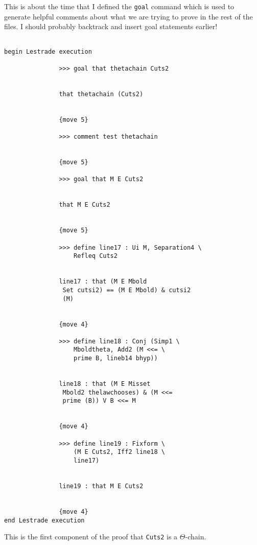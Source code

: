 \documentclass[12pt]{article}
\begin{document}
This is about the time that I defined the {\tt goal} command which is used to generate helpful comments about what we are trying to prove in the rest of the files.  I should probably
backtrack and insert goal statements earlier!


\begin{verbatim}

begin Lestrade execution

               >>> goal that thetachain Cuts2


               that thetachain (Cuts2)


               {move 5}

               >>> comment test thetachain


               {move 5}

               >>> goal that M E Cuts2


               that M E Cuts2


               {move 5}

               >>> define line17 : Ui M, Separation4 \
                   Refleq Cuts2


               line17 : that (M E Mbold 
                Set cutsi2) == (M E Mbold) & cutsi2 
                (M)


               {move 4}

               >>> define line18 : Conj (Simp1 \
                   Mboldtheta, Add2 (M <<= \
                   prime B, lineb14 bhyp))


               line18 : that (M E Misset 
                Mbold2 thelawchooses) & (M <<= 
                prime (B)) V B <<= M


               {move 4}

               >>> define line19 : Fixform \
                   (M E Cuts2, Iff2 line18 \
                   line17)


               line19 : that M E Cuts2


               {move 4}
end Lestrade execution
\end{verbatim}

This is the first component of the proof that {\tt Cuts2} is a $\Theta$-chain.
\end{document}
